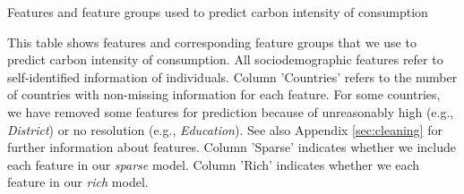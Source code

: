 \begin{table}[ht!]
\begin{adjustbox}{width=1\textwidth}
\end{adjustbox}
  \caption{Features and feature groups used to predict carbon intensity of consumption}
  \label{tab:features}

\begin{subcaption2}
This table shows features and corresponding feature groups that we use to predict carbon intensity of consumption. All sociodemographic features refer to self-identified information of individuals. Column 'Countries' refers to the number of countries with non-missing information for each feature. For some countries, we have removed some features for prediction because of unreasonably high (e.g., \textit{District}) or no resolution (e.g., \textit{Education}). See also Appendix \ref{sec:cleaning} for further information about features. Column 'Sparse' indicates whether we include each feature in our \textit{sparse} model. Column 'Rich' indicates whether we each feature in our \textit{rich} model.
\end{subcaption2}
\end{table}